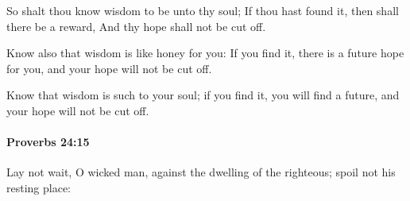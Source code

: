 			\begin{versebox}
					\item[BHS] 
					\item[ASV] So shalt thou know wisdom to be unto thy soul; If thou hast found it, then shall there be a reward, And thy hope shall not be cut off.
					\item[NIV] Know also that wisdom is like honey for you: If you find it, there is a future hope for you, and your hope will not be cut off.
					\item[NRSV] Know that wisdom is such to your soul; if you find it, you will find a future, and your hope will not be cut off.
			\end{versebox}

		\paragraph{Proverbs 24:15} %
			\label{PROVERBS-24-15}

			Lay not wait, O wicked man, against the dwelling of the righteous; spoil not his resting place:

